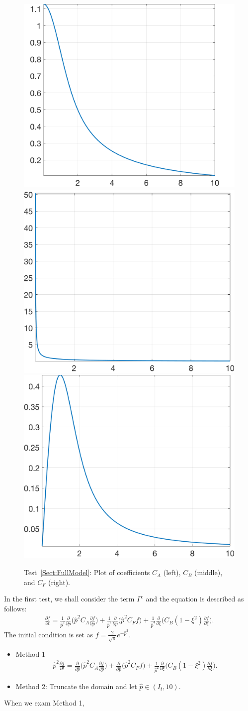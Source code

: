 \documentclass[preprint,11pt]{elsarticle}
\begin{document}
\begin{figure}[H]
\centering
\includegraphics[width=.32\textwidth]{./NumFig/FullModel-Ca}
\includegraphics[width=.32\textwidth]{./NumFig/FullModel-Cb}
\includegraphics[width=.32\textwidth]{./NumFig/FullModel-Cf}
\caption{Test~\ref{Sect:FullModel}: Plot of coefficients $C_A$ (left), $C_B$ (middle), and $C_F$ (right).}
\end{figure}

In the first test, we shall consider the term $\Gamma^c$ and the equation is described as follows:
\begin{eqnarray*}
\frac{\partial f}{\partial t} = \frac{1}{{\hat p}^2}\frac{\partial}{\partial {\hat p}}\bigg({\hat p}^2C_A\frac{\partial f}{\partial {\hat p}}\bigg) + \frac{1}{{\hat p}^2}\frac{\partial}{\partial {\hat p}}\bigg({\hat p}^2C_F f\bigg)+\frac{1}{{\hat p}^4}\frac{\partial}{\partial\xi}\bigg(C_B(1-\xi^2)\frac{\partial f}{\partial\xi}\bigg).
\end{eqnarray*}
The initial condition is set as $f= \frac{2}{\sqrt \pi} e^{-{\hat p}^2}$.

\begin{itemize}
\item Method 1
\begin{eqnarray}
\hat{p}^2\frac{\partial f}{\partial t} = \frac{\partial}{\partial {\hat p}}\bigg({\hat p}^2C_A\frac{\partial f}{\partial {\hat p}}\bigg) + \frac{\partial}{\partial {\hat p}}\bigg({\hat p}^2C_F f\bigg)+\frac{1}{{\hat p}^2}\frac{\partial}{\partial\xi}\bigg(C_B(1-\xi^2)\frac{\partial f}{\partial\xi}\bigg).
\end{eqnarray}
\item Method 2: Truncate the domain and let $\hat{p}\in(I_t,10)$.
\end{itemize}
When we exam Method 1, 
\end{document}
